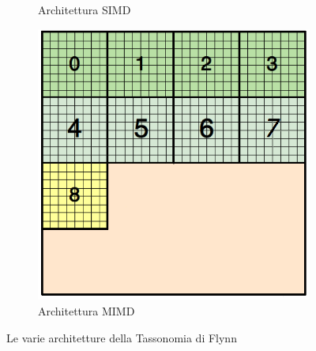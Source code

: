 \begin{figure}[H]
\begin{subfigure}{.5\textwidth}
		\caption{Architettura SIMD\newline}
		\label{fig:simd}
	\end{subfigure}%
	\begin{subfigure}{.5\textwidth}
		\centering
		\includegraphics[width=0.45\linewidth]{immagini/block_on_grid.png}
		\caption{Architettura MIMD\newline}
		\label{fig:mimd}
	\end{subfigure}
	\caption{Le varie architetture della Tassonomia di Flynn}
\end{figure}

